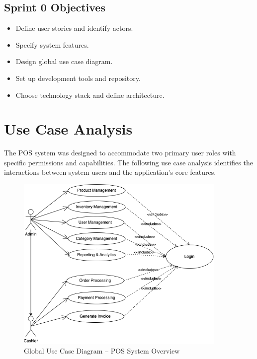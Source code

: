 \subsection{Sprint 0 Objectives}

\begin{itemize}
  \item Define user stories and identify actors.
  \item Specify system features.
  \item Design global use case diagram.
  \item Set up development tools and repository.
  \item Choose technology stack and define architecture.
\end{itemize}

\section{Use Case Analysis}

The POS system was designed to accommodate two primary user roles with specific permissions and capabilities. The following use case analysis identifies the interactions between system users and the application's core features.

\begin{figure}[H]
  \centering
  \includegraphics[width=0.9\textwidth]{figures/images/sprint0usecase.png}
  \caption{Global Use Case Diagram – POS System Overview}
  \label{fig:sprint0-usecase}
\end{figure}

